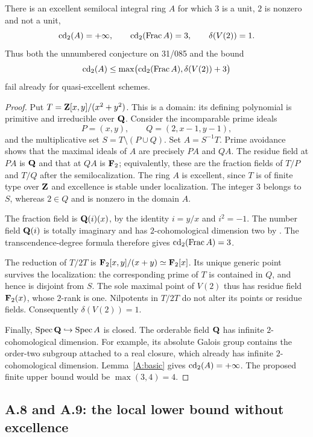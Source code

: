 \begin{theorem}
\label{A:mixedreal}
There is an excellent semilocal integral ring $A$ for which $3$ is a unit, $2$ is nonzero and not a unit,
\[
\operatorname{cd}_2(A)=+\infty,\qquad
\operatorname{cd}_2(\operatorname{Frac} A)=3,\qquad \delta(V(2))=1.
\]
Thus both the unnumbered conjecture on 31/085 and the bound
\[
\operatorname{cd}_2(A)\leq\max\bigl(\operatorname{cd}_2(\operatorname{Frac} A),\delta(V(2))+3\bigr)
\]
fail already for quasi-excellent schemes.
\end{theorem}
\begin{proof}
Put $T=\mathbf Z[x,y]/(x^2+y^2)$. This is a domain: its defining polynomial is primitive and irreducible over $\mathbf Q$. Consider the incomparable prime ideals
\[
P=(x,y),\qquad Q=(2,x-1,y-1),
\]
and the multiplicative set $S=T\setminus(P\cup Q)$. Set $A=S^{-1}T$. Prime avoidance shows that the maximal ideals of $A$ are precisely $PA$ and $QA$. The residue field at $PA$ is $\mathbf Q$ and that at $QA$ is $\mathbf F_2$; equivalently, these are the fraction fields of $T/P$ and $T/Q$ after the semilocalization. The ring $A$ is excellent, since $T$ is of finite type over $\mathbf Z$ and excellence is stable under localization. The integer $3$ belongs to $S$, whereas $2\in Q$ and is nonzero in the domain $A$.

The fraction field is $\mathbf Q(i)(x)$, by the identity $i=y/x$ and $i^2=-1$. The number field $\mathbf Q(i)$ is totally imaginary and has $2$-cohomological dimension two by \citet[Theorem I.4.10(c)]{A_Milne2006}. The transcendence-degree formula \citet[Exposé X, Théorème 2.1]{A_SGA4} therefore gives $\operatorname{cd}_2(\operatorname{Frac} A)=3$.

The reduction of $T/2T$ is $\mathbf F_2[x,y]/(x+y)\simeq\mathbf F_2[x]$. Its unique generic point survives the localization: the corresponding prime of $T$ is contained in $Q$, and hence is disjoint from $S$. The sole maximal point of $V(2)$ thus has residue field $\mathbf F_2(x)$, whose $2$-rank is one. Nilpotents in $T/2T$ do not alter its points or residue fields. Consequently $\delta(V(2))=1$.

Finally, $\operatorname{Spec}\mathbf Q\hookrightarrow\operatorname{Spec} A$ is closed. The orderable field $\mathbf Q$ has infinite $2$-cohomological dimension. For example, its absolute Galois group contains the order-two subgroup attached to a real closure, which already has infinite $2$-cohomological dimension. Lemma~\ref{A:basic} gives $\operatorname{cd}_2(A)=+\infty$. The proposed finite upper bound would be $\max(3,4)=4$.
\end{proof}

\subsection{A.8 and A.9: the local lower bound without excellence}

